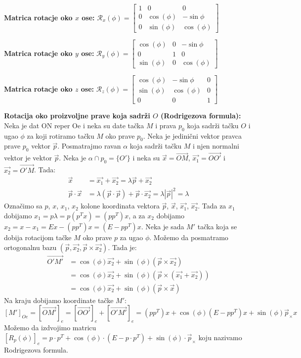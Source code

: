 \documentclass[12pt]{article}
\newcommand{\vek}[1]{\overrightarrow{#1}}
\begin{document}
\textbf{Matrica rotacje oko $x$ ose:} $\mathcal{R}_x(\phi)=\begin{bmatrix}
        1 & 0          & 0           \\
        0 & \cos(\phi) & -\sin{\phi} \\
        0 & \sin(\phi) & \cos(\phi)
    \end{bmatrix}$
\par
\textbf{Matrica rotacje oko $y$ ose:} $\mathcal{R}_y(\phi)=\begin{bmatrix}
        \cos(\phi) & 0 & -\sin{\phi} \\
        0          & 1 & 0           \\
        \sin(\phi) & 0 & \cos(\phi)
    \end{bmatrix}$
\par
\textbf{Matrica rotacje oko $z$ ose:} $\mathcal{R}_z(\phi)=\begin{bmatrix}
        \cos(\phi) & -\sin{\phi} & 0 \\
        \sin(\phi) & \cos(\phi)  & 0 \\
        0          & 0           & 1
    \end{bmatrix}$
\par
\textbf{Rotacija oko proizvoljne prave koja sadrži $O$ (Rodrigezova formula):}
Neka je dat ON reper Oe i neka su date tačka $M$ i prava $p_0$ koja sadrži
tačku $O$ i ugao $\phi$ za koji rotiramo tačku $M$ oko prave
$p_0$. Neka je jedinični vektor pravca prave $p_0$ vektor $\vek{p}$. Posmatrajmo
ravan $\alpha$ koja sadrži tačku $M$ i njen normalni vektor je vektor
$\vek{p}$. Neka je $\alpha\cap p_0 =\{O'\}$ i neka su $\vek{x}=\vek{OM}$,
$\vek{x_1}=\vek{OO'}$ i $\vek{x_2}=\vek{O'M}$. Tada:
\begin{align*}
    \vek{x}             & =\vek{x_1}+\vek{x_2} = \lambda\vek{p}+\vek{x_2}                                  \\
    \vek{p}\cdot\vek{x} & =\lambda(\vek{p}\cdot\vek{p})+\vek{p}\cdot\vek{x_2} =\lambda|\vek{p}|^2 =\lambda
\end{align*}
Označimo sa $p$, $x$, $x_1$, $x_2$ kolone koordinata vektora $\vek{p}$,
$\vek{x}$, $\vek{x_1}$, $\vek{x_2}$. Tada za $x_1$ dobijamo
$x_1=p\lambda=p(p^Tx)=(pp^T)x$, a za $x_2$ dobijamo
$x_2=x-x_1=Ex-(pp^T)x=(E-pp^T)x$. Neka je sada $M'$ tačka koja se dobija
rotacijom tačke $M$ oko prave $p$ za ugao $\phi$. Možemo da posmatramo
ortogonalnu bazu $(\vek{p},\vek{x_2},\vek{p}\times\vek{x_2})$. Tada je:
\begin{align*}
    \vek{O'M'} & =\cos(\phi)\vek{x_2}+\sin(\phi)(\vek{p}\times\vek{x_2})             \\
               & =\cos(\phi)\vek{x_2}+\sin(\phi)(\vek{p}\times(\vek{x_1}+\vek{x_2})) \\
               & =\cos(\phi)\vek{x_2}+\sin(\phi)(\vek{p}\times\vek{x})
\end{align*}
Na kraju dobijamo koordinate tačke $M'$:
$$[M']_{Oe}=[\vek{OM'}]_e=[\vek{OO'}]_e+[\vek{O'M'}]_e=(pp^T)x+\cos(\phi)(E-pp^T)x+\sin(\phi)\vek{p}_\times x$$
Možemo da izdvojimo matricu
$[R_p(\phi)]_e=p\cdot p^T+\cos(\phi)\cdot(E-p\cdot p^T)+\sin(\phi)\cdot\vek{p}_\times$
koju nazivamo Rodrigezova formula.
\par
\end{document}
